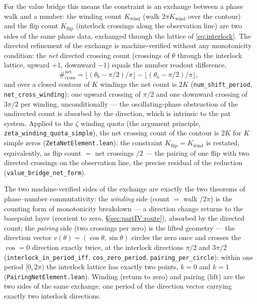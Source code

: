 \documentclass{article}
\newcommand{\zt}{\zeta}
\begin{document}
For the value bridge this means the constraint is an exchange between
a phase walk and a number: the winding count $K_{\mathrm{wind}}$
(walk $2\pi K_{\mathrm{wind}}$ over the contour) and the flip count
$K_{\mathrm{flip}}$ (interlock crossings along the observation line)
are two sides of the same phase data, exchanged through the lattice
of \eqref{eq:interlock}. The directed refinement of the exchange is
machine-verified without any monotonicity condition: the \emph{net}
directed crossing count (crossings of $\theta$ through the interlock
lattice, upward $+1$, downward $-1$) equals the number readout
difference,
\begin{equation}
  \#^{\mathrm{net}}_{\mathrm{cross}} = \lfloor(\theta_b-\pi/2)/\pi\rfloor
    - \lfloor(\theta_a-\pi/2)/\pi\rfloor,
\end{equation}
and over a closed contour of $K$ windings the net count is $2K$
(\texttt{num\_shift\_period}, \texttt{net\_cross\_winding}): one
upward crossing of $\pi/2$ and one downward crossing of $3\pi/2$
per winding, unconditionally --- the oscillating-phase obstruction
of the undirected count is absorbed by the direction, which is
intrinsic to the pat system. Applied to the $\zt$ winding quota
(the argument principle, \texttt{zeta\_winding\_quota\_simple}), the
net crossing count of the contour is $2K$ for $K$ simple zeros
(\texttt{ZetaNetElement.lean}): the constraint
$K_{\mathrm{flip}}=K_{\mathrm{wind}}$ is restated, equivalently, as
flip count $=$ net crossings $/2$ --- the pairing of one flip with
two directed crossings on the observation line, the precise residual
of the reduction (\texttt{value\_bridge\_net\_form}).

The two machine-verified sides of the exchange are exactly the two
theorems of phase--number commutativity: the \emph{winding} side
(count $=$ walk $/2\pi$) is the counting form of monotonicity
breakdown --- a direction change returns to the basepoint layer
(reorient to zero, \S\ref{sec:partIV:route}), absorbed by the
directed count; the \emph{pairing} side (two crossings per zero) is
the lifted geometry --- the direction vector $v(\theta)=(\cos\theta,
\sin\theta)$ circles the zero once and crosses the $\cos=0$ direction
exactly twice, at the interlock directions $\pi/2$ and $3\pi/2$
(\texttt{interlock\_in\_period\_iff}, \texttt{cos\_zero\_period},
\texttt{pairing\_per\_circle}): within one period $[0,2\pi)$ the
interlock lattice has exactly two points, $k=0$ and $k=1$
(\texttt{PairingNetElement.lean}). Winding (return to zero) and
pairing (lift) are the two sides of the same exchange, one period of
the direction vector carrying exactly two interlock directions.
\end{document}
